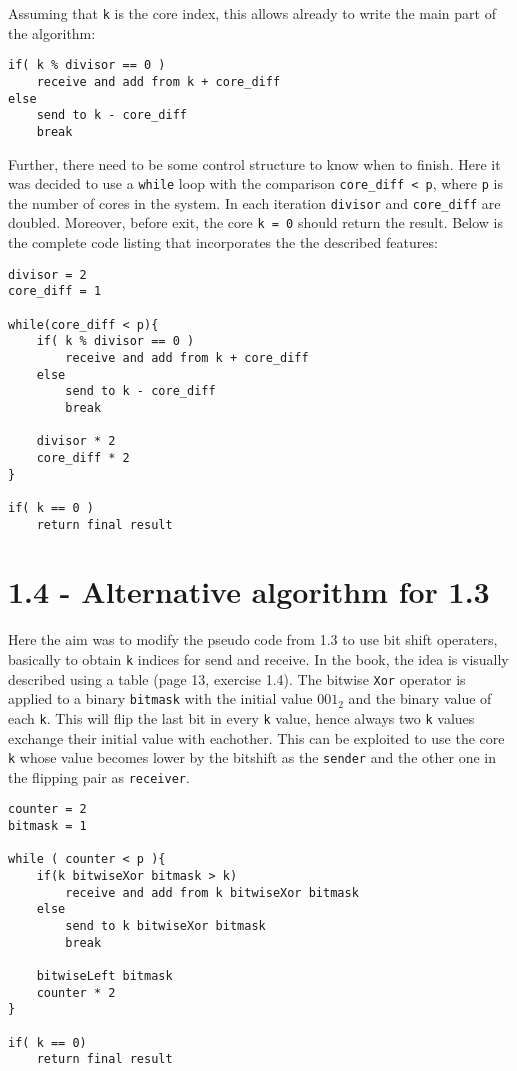 \documentclass[a4paper,11pt,twoside]{article}
\begin{document}
Assuming that \verb+k+ is the core index, this allows already to write the main part of the algorithm:
\begin{verbatim}
if( k % divisor == 0 )
    receive and add from k + core_diff
else
    send to k - core_diff
    break
\end{verbatim}

Further, there need to be some control structure to know when to finish. Here it was decided to use a \verb+while+ loop with the comparison \verb+core_diff < p+, where \verb+p+ is the number of cores in the system. In each iteration \verb+divisor+ and \verb+core_diff+ are doubled. Moreover, before exit, the core \verb+k = 0+ should return the result. Below is the complete code listing that incorporates the the described features:

\begin{verbatim}
divisor = 2
core_diff = 1

while(core_diff < p){
    if( k % divisor == 0 )
        receive and add from k + core_diff
    else 
        send to k - core_diff
        break

    divisor * 2
    core_diff * 2
}

if( k == 0 )
    return final result
\end{verbatim}

\section{1.4 - Alternative algorithm for 1.3}
Here the aim was to modify the pseudo code from 1.3 to use bit shift operaters, basically to obtain \verb+k+ indices for send and receive. In the book, the idea is visually described using a table (page 13, exercise 1.4). The bitwise \verb+Xor+ operator is applied to a binary \verb+bitmask+ with the initial value $001_{2}$ and the binary value of each \verb+k+. This will flip the last bit in every \verb+k+ value, hence always two \verb+k+ values exchange their initial value with eachother. This can be exploited to use the core \verb+k+ whose value becomes lower by the bitshift as the \verb+sender+ and the other one in the flipping pair as \verb+receiver+.     

\begin{verbatim}
counter = 2
bitmask = 1

while ( counter < p ){
    if(k bitwiseXor bitmask > k)
        receive and add from k bitwiseXor bitmask
    else
        send to k bitwiseXor bitmask
        break

    bitwiseLeft bitmask
    counter * 2
}

if( k == 0)
    return final result

\end{verbatim}
\end{document}
